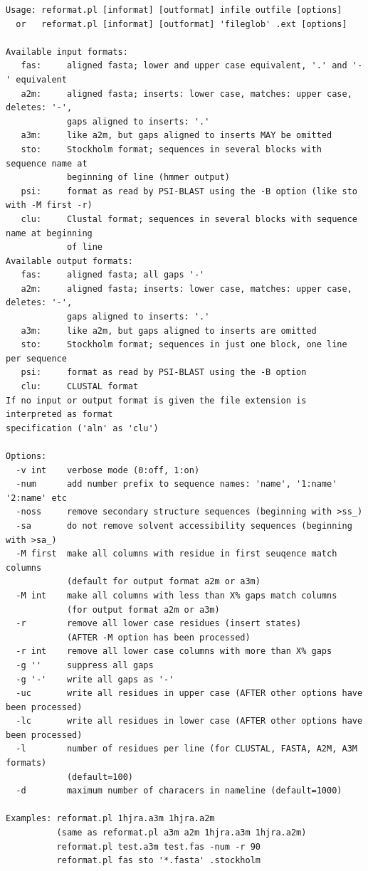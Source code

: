 \documentclass[11pt,a4paper]{article}
\begin{document}
\small \begin{verbatim}
Usage: reformat.pl [informat] [outformat] infile outfile [options] 
  or   reformat.pl [informat] [outformat] 'fileglob' .ext [options] 

Available input formats:
   fas:     aligned fasta; lower and upper case equivalent, '.' and '-' equivalent
   a2m:     aligned fasta; inserts: lower case, matches: upper case, deletes: '-',
            gaps aligned to inserts: '.'
   a3m:     like a2m, but gaps aligned to inserts MAY be omitted
   sto:     Stockholm format; sequences in several blocks with sequence name at 
            beginning of line (hmmer output)
   psi:     format as read by PSI-BLAST using the -B option (like sto with -M first -r)
   clu:     Clustal format; sequences in several blocks with sequence name at beginning 
            of line
Available output formats:
   fas:     aligned fasta; all gaps '-'
   a2m:     aligned fasta; inserts: lower case, matches: upper case, deletes: '-', 
            gaps aligned to inserts: '.'
   a3m:     like a2m, but gaps aligned to inserts are omitted
   sto:     Stockholm format; sequences in just one block, one line per sequence
   psi:     format as read by PSI-BLAST using the -B option 
   clu:     CLUSTAL format
If no input or output format is given the file extension is interpreted as format 
specification ('aln' as 'clu')

Options:
  -v int    verbose mode (0:off, 1:on)
  -num      add number prefix to sequence names: 'name', '1:name' '2:name' etc
  -noss     remove secondary structure sequences (beginning with >ss_)
  -sa       do not remove solvent accessibility sequences (beginning with >sa_)
  -M first  make all columns with residue in first seuqence match columns 
            (default for output format a2m or a3m)
  -M int    make all columns with less than X% gaps match columns 
            (for output format a2m or a3m)
  -r        remove all lower case residues (insert states) 
            (AFTER -M option has been processed)
  -r int    remove all lower case columns with more than X% gaps
  -g ''     suppress all gaps
  -g '-'    write all gaps as '-'
  -uc       write all residues in upper case (AFTER other options have been processed)
  -lc       write all residues in lower case (AFTER other options have been processed)
  -l        number of residues per line (for CLUSTAL, FASTA, A2M, A3M formats) 
            (default=100)
  -d        maximum number of characers in nameline (default=1000)

Examples: reformat.pl 1hjra.a3m 1hjra.a2m  
          (same as reformat.pl a3m a2m 1hjra.a3m 1hjra.a2m)
          reformat.pl test.a3m test.fas -num -r 90
          reformat.pl fas sto '*.fasta' .stockholm
\end{verbatim} \normalsize
\end{document}
